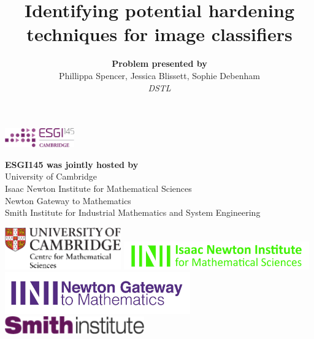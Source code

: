 \documentclass[12pt]{article}
\begin{document}
\title{\LARGE \textbf{Identifying potential hardening techniques for image classifiers}}
\author{\small\textbf{Problem presented by}\\
Phillippa Spencer, Jessica Blissett, Sophie Debenham\\
\small\textit{DSTL}
}
\date{}
\maketitle
\vskip1.5cm
\begin{center}
  \includegraphics[width=3cm]{ESGI_logo-cambridge.jpg}  
\end{center}

\begin{center}
\textbf{ESGI145 was jointly hosted by}\\
University of Cambridge\\
Isaac Newton Institute for Mathematical Sciences\\
Newton Gateway to Mathematics \\
Smith Institute for Industrial Mathematics and System Engineering
\end{center}
\vskip1cm
\begin{center}
\includegraphics[width=5cm]{CambridgeMaths.png}
\includegraphics[width=8cm]{INILogo.jpg}
\vskip0.5cm
\includegraphics[width=8cm]{GatewayLogo_Cropped.jpg}
\includegraphics[width=6cm]{SmithInstitute.png}
\end{center}
\end{document}
